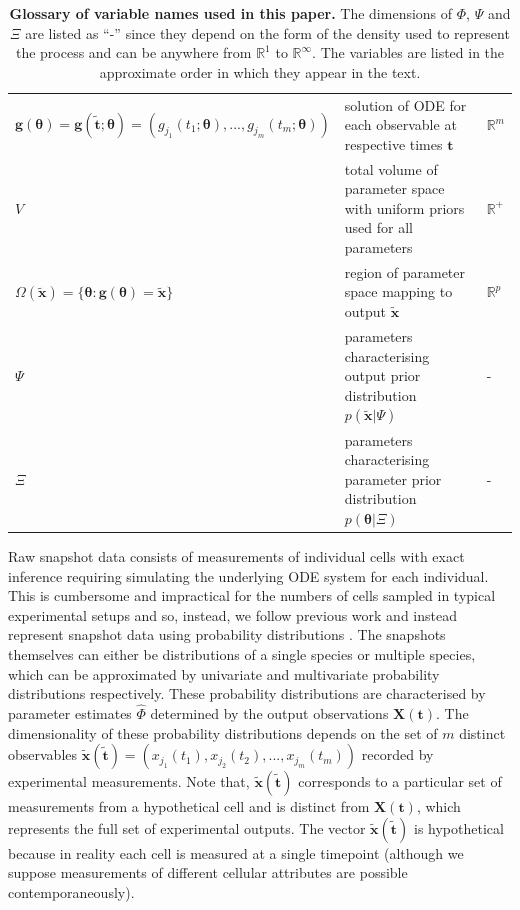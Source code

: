 \documentclass[10pt,letterpaper]{article}
\begin{document}
\begin{table}[htbp]
\begin{adjustwidth}{-2in}{-1in}
\begin{tabularx}{1.65\textwidth}{lll}
			$\boldsymbol{g}(\boldsymbol{\theta})=\boldsymbol{g}(\tilde{\boldsymbol{t}};\boldsymbol{\theta})=(g_{j_1}(t_1; \boldsymbol{\theta}),...,g_{j_m}(t_m; \boldsymbol{\theta}))$ & solution of ODE for each observable at respective times $\boldsymbol{t}$ & $\mathbb{R}^m$\\
			$V$ & total volume of parameter space with uniform priors used for all parameters & $\mathbb{R}^+$\\
			$\Omega(\tilde{\boldsymbol{x}}) = \{\boldsymbol{\theta}: \boldsymbol{g}(\boldsymbol{\theta}) = \tilde{\boldsymbol{x}}\}$ & region of parameter space mapping to output $\tilde{\boldsymbol{x}}$ & $\mathbb{R}^p$\\
			$\Psi$ & parameters characterising output prior distribution $p(\tilde{\boldsymbol{x}}|\Psi)$ & -\\
			$\Xi$ & parameters characterising parameter prior distribution $p(\boldsymbol{\theta}|\Xi)$ & -
			\end{tabularx}
		\caption{\textbf{Glossary of variable names used in this paper.} The dimensions of $\Phi$, $\Psi$ and $\Xi$ are listed as ``-'' since they depend on the form of the density used to represent the process and can be anywhere from $\mathbb{R}^1$ to $\mathbb{R}^\infty$. The variables are listed in the approximate order in which they appear in the text.}
		\label{tab:variable_glossary}%
	\end{adjustwidth}
\end{table}%

Raw snapshot data consists of measurements of individual cells with exact inference requiring simulating the underlying ODE system for each individual. This is cumbersome and impractical for the numbers of cells sampled in typical experimental setups and so, instead, we follow previous work and instead represent snapshot data using probability distributions \cite{hasenauer2011identification,hasenauer2014ode,loos2018hierarchical,dixit2018maximum}. The snapshots themselves can either be distributions of a single species or multiple species, which can be approximated by univariate and multivariate probability distributions respectively. These probability distributions are characterised by parameter estimates $\hat{\Phi}$ determined by the output observations $\boldsymbol{X}(\boldsymbol{t})$. The dimensionality of these probability distributions depends on the set of $m$ distinct observables $\tilde{\boldsymbol{x}}(\tilde{\boldsymbol{t}})=(x_{j_1}(t_1), x_{j_2}(t_2), ..., x_{j_m}(t_m))$ recorded by experimental measurements. Note that, $\tilde{\boldsymbol{x}}(\tilde{\boldsymbol{t}})$ corresponds to a particular set of measurements from a hypothetical cell and is distinct from $\boldsymbol{X}(\boldsymbol{t})$, which represents the full set of experimental outputs. The vector $\tilde{\boldsymbol{x}}(\tilde{\boldsymbol{t}})$ is hypothetical because in reality each cell is measured at a single timepoint (although we suppose measurements of different cellular attributes are possible contemporaneously).
\end{document}
